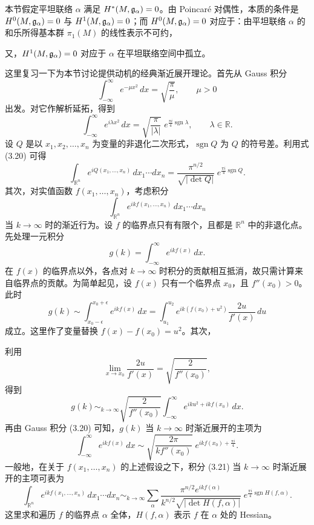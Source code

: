 本节假定平坦联络 $\alpha$ 满足 $H^{*}(M,\mathfrak{g}_{\alpha})=0$。由 Poincaré 对偶性，本质的条件是 $H^{0}(M,\mathfrak{g}_{\alpha})=0$ 与 $H^{1}(M,\mathfrak{g}_{\alpha})=0$；而 $H^{0}(M,\mathfrak{g}_{\alpha})=0$ 对应于：由平坦联络 $\alpha$ 的和乐所得基本群 $\pi_{1}(M)$ 的线性表示不可约，

又，$H^{1}(M,\mathfrak{g}_{\alpha})=0$ 对应于 $\alpha$ 在平坦联络空间中孤立。


这里复习一下为本节讨论提供动机的经典渐近展开理论。首先从 Gauss 积分
\[
  \int_{-\infty}^{\infty}e^{-\mu x^{2}}\,dx=\sqrt{\frac{\pi}{\mu}},\qquad \mu>0
\]
出发。对它作解析延拓，得到
\begin{equation}
  \int_{-\infty}^{\infty}e^{i\lambda x^{2}}\,dx
  =\sqrt{\frac{\pi}{|\lambda|}}\;e^{\frac{\pi i}{4}\operatorname{sgn}\lambda},\qquad \lambda\in\mathbb{R}.
  \tag{3.20}
\end{equation}
设 $Q$ 是以 $x_{1},x_{2},\dots,x_{n}$ 为变量的非退化二次形式，$\operatorname{sgn} Q$ 为 $Q$ 的符号差。利用式 (3.20) 可得
\[
  \int_{\mathbb{R}^{n}}e^{iQ(x_{1},\dots,x_{n})}\,dx_{1}\cdots dx_{n}
  =\frac{\pi^{n/2}}{\sqrt{|\det Q|}}\;e^{\frac{\pi i}{4}\operatorname{sgn} Q}.
\]
其次，对实值函数 $f(x_{1},\dots,x_{n})$，考虑积分
\begin{equation}
  \int_{\mathbb{R}^{n}}e^{ikf(x_{1},\dots,x_{n})}\,dx_{1}\cdots dx_{n}
  \tag{3.21}
\end{equation}
当 $k\to\infty$ 时的渐近行为。设 $f$ 的临界点只有有限个，且都是 $\mathbb{R}^{n}$ 中的非退化点。先处理一元积分
\[
  g(k)=\int_{-\infty}^{\infty}e^{ikf(x)}\,dx .
\]
在 $f(x)$ 的临界点以外，各点对 $k\to\infty$ 时积分的贡献相互抵消，故只需计算来自临界点的贡献。为简单起见，设 $f(x)$ 只有一个临界点 $x_{0}$，且 $f''(x_{0})>0$。此时
\[
  g(k)\sim\int_{x_{0}-\epsilon}^{x_{0}+\epsilon}e^{ikf(x)}\,dx
  =\int_{u_{1}}^{u_{2}}e^{ik(f(x_{0})+u^{2})}\frac{2u}{f'(x)}\,du
\]
成立。这里作了变量替换 $f(x)-f(x_{0})=u^{2}$。其次，

利用
\[
  \lim_{x\to x_{0}}\frac{2u}{f'(x)}=\sqrt{\frac{2}{f''(x_{0})}},
\]
得到
\[
  g(k)\sim_{k\to\infty}\sqrt{\frac{2}{f''(x_{0})}}
  \int_{-\infty}^{\infty}e^{iku^{2}+ikf(x_{0})}\,dx .
\]
再由 Gauss 积分 (3.20) 可知，$g(k)$ 当 $k\to\infty$ 时渐近展开的主项为
\[
  \int_{-\infty}^{\infty}e^{ikf(x)}\,dx
  \sim\sqrt{\frac{2\pi}{k f''(x_{0})}}\;e^{ikf(x_{0})+\frac{\pi i}{4}} .
\]
一般地，在关于 $f(x_{1},\dots,x_{n})$ 的上述假设之下，积分 (3.21) 当 $k\to\infty$ 时渐近展开的主项可表为
\begin{equation}
  \int_{\mathbb{R}^{n}}e^{ikf(x_{1},\dots,x_{n})}\,dx_{1}\cdots dx_{n}
  \sim_{k\to\infty}
  \sum_{\alpha}\frac{\pi^{n/2}e^{ikf(\alpha)}}{k^{n/2}\sqrt{|\det H(f,\alpha)|}}
  \;e^{\frac{\pi i}{4}\operatorname{sgn} H(f,\alpha)} .
  \tag{3.22}
\end{equation}
这里求和遍历 $f$ 的临界点 $\alpha$ 全体，$H(f,\alpha)$ 表示 $f$ 在 $\alpha$ 处的 Hessian。

